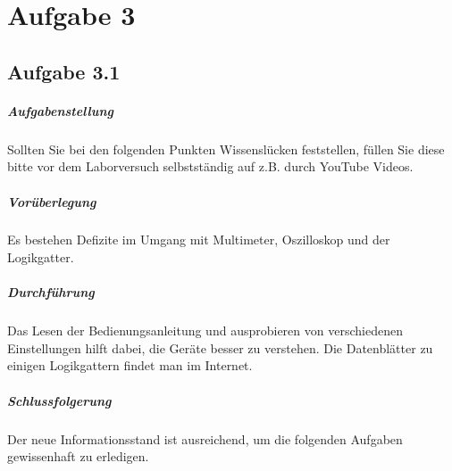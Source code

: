\chapter{Aufgabe 3}
\section{Aufgabe 3.1}

\paragraph{Aufgabenstellung}
Sollten Sie bei den folgenden Punkten Wissenslücken feststellen, füllen Sie diese bitte vor dem Laborversuch selbstständig auf z.B. durch YouTube Videos.

\paragraph{Vorüberlegung}
Es bestehen Defizite im Umgang mit Multimeter, Oszilloskop und der Logikgatter. 

\paragraph{Durchführung}
Das Lesen der Bedienungsanleitung und ausprobieren von verschiedenen Einstellungen hilft dabei, die Geräte besser zu verstehen. Die Datenblätter zu einigen Logikgattern findet man im Internet.

\paragraph{Schlussfolgerung}
Der neue Informationsstand ist ausreichend, um die folgenden Aufgaben gewissenhaft zu erledigen.